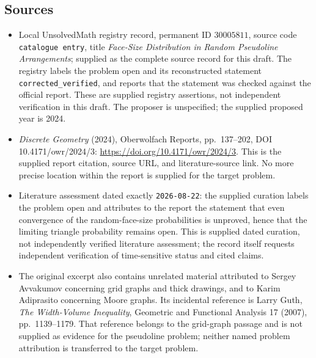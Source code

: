 \documentclass[11pt]{article}
\begin{document}
\subsection{Sources}
\begin{itemize}
\item Local UnsolvedMath registry record, permanent ID \(30005811\), source code \texttt{catalogue entry}, title \emph{Face-Size Distribution in Random Pseudoline Arrangements}; supplied as the complete source record for this draft. The registry labels the problem open and its reconstructed statement \texttt{corrected\_verified}, and reports that the statement was checked against the official report. These are supplied registry assertions, not independent verification in this draft. The proposer is unspecified; the supplied proposed year is 2024.
\item \emph{Discrete Geometry} (2024), Oberwolfach Reports, pp.\ 137--202, DOI 10.4171/owr/2024/3: \url{https://doi.org/10.4171/owr/2024/3}. This is the supplied report citation, source URL, and literature-source link. No more precise location within the report is supplied for the target problem.
\item Literature assessment dated exactly \texttt{2026-08-22}: the supplied curation labels the problem open and attributes to the report the statement that even convergence of the random-face-size probabilities is unproved, hence that the limiting triangle probability remains open. This is supplied dated curation, not independently verified literature assessment; the record itself requests independent verification of time-sensitive status and cited claims.
\item The original excerpt also contains unrelated material attributed to Sergey Avvakumov concerning grid graphs and thick drawings, and to Karim Adiprasito concerning Moore graphs. Its incidental reference is Larry Guth, \emph{The Width-Volume Inequality}, Geometric and Functional Analysis 17 (2007), pp.\ 1139--1179. That reference belongs to the grid-graph passage and is not supplied as evidence for the pseudoline problem; neither named problem attribution is transferred to the target problem.
\end{itemize}
\end{document}
